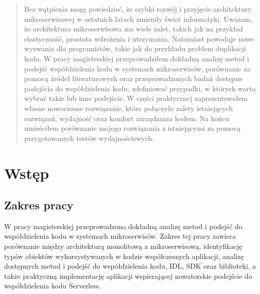 \documentclass[runningheads,12pt]{llncs}
\begin{document}
\newpage

\begin{abstract}
Bez wątpienia mogę powiedzieć, że szybki rozwój i przyjęcie architektury mikroserwisowej w ostatnich latach zmieniły świat informatyki. Uważam, że architektura mikroserwisowa ma wiele zalet, takich jak na przykład elastyczność, prostota wdrożenia i utrzymania. Natomiast powoduje nowe wyzwania dla programistów, takie jak do przykładu problem duplikacji kodu. W pracy magisterskiej przeprowadziłem dokładną analizę metod i podejść współdzielenia kodu w systemach mikroserwisów, porównanie za pomocą źródeł literaturowych oraz przeprowadzonych badań dostępne podejścia do współdzielenia kodu, zdefiniować przypadki, w których warto wybrać takie lub inne podejście. W części praktycznej zaprezentowałem własne nowoczesne rozwiązanie, które połączyło zalety istniejących rozwiązań, wydajność oraz komfort zarządzania kodem. Na końcu umieściłem porównanie mojego rozwiązania z istniejącymi za pomocą przygotowanych testów wydajnościowych.
\end{abstract}

\newpage

\tableofcontents

\newpage

\section{Wstęp}

\subsection{Zakres pracy}
W pracy magisterskiej przeprowadzono dokładną analizę metod i podejść do współdzielenia kodu w systemach mikroserwisów. Zakres tej pracy zawiera porównanie między architekturą monolitową a mikroserwisową, identyfikację typów obiektów wykorzystywanych w kodzie współczesnych aplikacji, analizę dostępnych metod i podejść do współdzielenia kodu, IDL, SDK oraz biblioteki, a także praktyczną implementację aplikacji wspierającej nowatorskie podejście do współdzielenia kodu Serverless.
\end{document}
